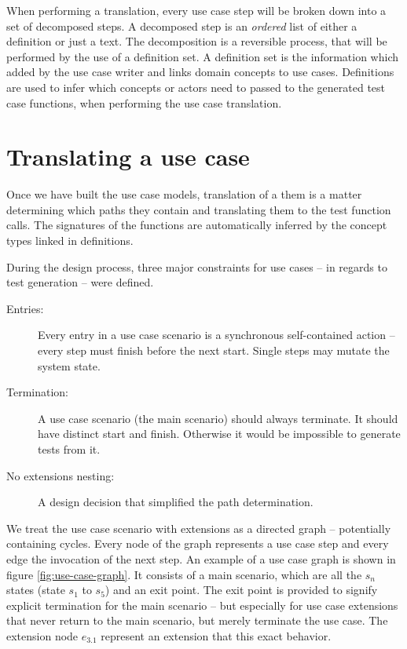 \noindent When performing a translation, every use case step will be broken down into a set of decomposed steps. A decomposed step is an \emph{ordered} list of either a definition or just a text. The decomposition is a reversible process, that will be performed by the use of a definition set. A definition set is the information which added by the use case writer and links domain concepts to use cases. Definitions are used to infer which concepts or actors need to passed to the generated test case functions, when performing the use case translation.

\section{Translating a use case}
Once we have built the use case models, translation of a them is a matter determining which paths they contain and translating them to the test function calls. The signatures of the functions are automatically inferred by the concept types linked in definitions.\medskip

\noindent During the design process, three major constraints for use cases -- in regards to test generation -- were defined. 
\begin{description}
  \item[Entries:] Every entry in a use case scenario is a synchronous self-contained action -- every step must finish before the next start. Single steps may mutate the system state.
  \item[Termination:] A use case scenario (the main scenario) should always terminate. It should have distinct start and finish. Otherwise it would be impossible to generate tests from it.
  \item[No extensions nesting:] A design decision that simplified the path determination.
\end{description}
We treat the use case scenario with extensions as a directed graph -- potentially containing cycles. Every node of the graph represents a use case step and every edge the invocation of the next step. An example of a use case graph is shown in figure \ref{fig:use-case-graph}. It consists of a main scenario, which are all the $s_n$ states (state $s_1$ to $s_5$) and an exit point. The exit point is provided to signify explicit termination for the main scenario -- but especially for use case extensions that never return to the main scenario, but merely terminate the use case. The extension node $e_{3.1}$ represent an extension that this exact behavior.\medskip

